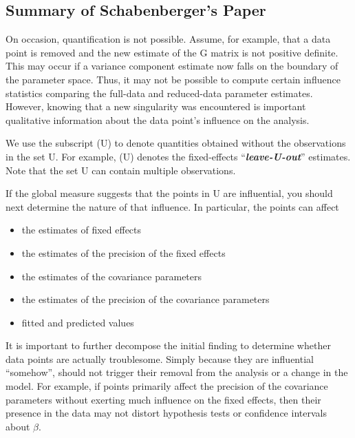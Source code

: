 \documentclass[12pt, a4paper]{article}
\begin{document}
\subsection{Summary of Schabenberger's Paper}

On occasion, quantification is not possible. Assume, for example, that a data point is removed
and the new estimate of the G matrix is not positive definite. This may occur if a variance component
estimate now falls on the boundary of the parameter space. Thus, it may not be possible to compute certain
influence statistics comparing the full-data and reduced-data parameter estimates. However, knowing that
a new singularity was encountered is important qualitative information about the data point’s influence on
the analysis.

We use the subscript (U) to denote quantities obtained without the observations in the set U. For example,
(U) denotes the fixed-effects “\textit{\textbf{leave-U-out}}” estimates. Note that the set U can contain multiple observations.


If the global measure suggests that the points in U are influential, you should next determine the nature of
that influence. In particular, the points can affect
\begin{itemize}
	\item the estimates of fixed effects
	\item the estimates of the precision of the fixed effects
	\item the estimates of the covariance parameters
	\item the estimates of the precision of the covariance parameters
	\item fitted and predicted values
\end{itemize}

It is important to further decompose the initial finding to determine whether data points are actually troublesome.
Simply because they are influential “somehow”, should not trigger their removal from the analysis or
a change in the model. For example, if points primarily affect the precision of the covariance parameters
without exerting much influence on the fixed effects, then their presence in the data may not distort hypothesis
tests or confidence intervals about $\beta$.
\end{document}
